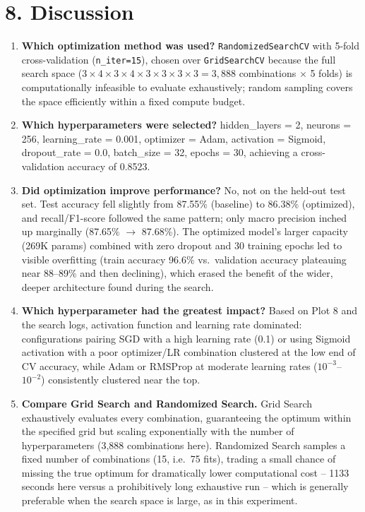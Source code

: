\documentclass[11pt]{article}
\begin{document}
\section*{8. Discussion}

\begin{enumerate}
\item \textbf{Which optimization method was used?} \texttt{RandomizedSearchCV} with 5-fold cross-validation (\texttt{n\_iter=15}), chosen over \texttt{GridSearchCV} because the full search space ($3\times4\times3\times4\times3\times3\times3\times3 = 3{,}888$ combinations $\times$ 5 folds) is computationally infeasible to evaluate exhaustively; random sampling covers the space efficiently within a fixed compute budget.

\item \textbf{Which hyperparameters were selected?} hidden\_layers = 2, neurons = 256, learning\_rate = 0.001, optimizer = Adam, activation = Sigmoid, dropout\_rate = 0.0, batch\_size = 32, epochs = 30, achieving a cross-validation accuracy of 0.8523.

\item \textbf{Did optimization improve performance?} No, not on the held-out test set. Test accuracy fell slightly from 87.55\% (baseline) to 86.38\% (optimized), and recall/F1-score followed the same pattern; only macro precision inched up marginally (87.65\% $\rightarrow$ 87.68\%). The optimized model's larger capacity (269K params) combined with zero dropout and 30 training epochs led to visible overfitting (train accuracy 96.6\% vs.\ validation accuracy plateauing near 88--89\% and then declining), which erased the benefit of the wider, deeper architecture found during the search.

\item \textbf{Which hyperparameter had the greatest impact?} Based on Plot 8 and the search logs, activation function and learning rate dominated: configurations pairing SGD with a high learning rate (0.1) or using Sigmoid activation with a poor optimizer/LR combination clustered at the low end of CV accuracy, while Adam or RMSProp at moderate learning rates ($10^{-3}$--$10^{-2}$) consistently clustered near the top.

\item \textbf{Compare Grid Search and Randomized Search.} Grid Search exhaustively evaluates every combination, guaranteeing the optimum within the specified grid but scaling exponentially with the number of hyperparameters (3,888 combinations here). Randomized Search samples a fixed number of combinations (15, i.e.\ 75 fits), trading a small chance of missing the true optimum for dramatically lower computational cost -- 1133 seconds here versus a prohibitively long exhaustive run -- which is generally preferable when the search space is large, as in this experiment.


\end{enumerate}
\end{document}
